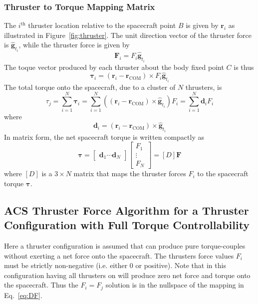 \subsubsection{Thruster to Torque Mapping Matrix}
The $i^{\text{th}}$ thruster location relative to the spacecraft point $B$ is given by $\bm r_{i}$ as illustrated in Figure~\ref{fig:thruster}.  The unit direction vector of the thruster force is $\hat{\bm g}_{t_{i}}$, while the thruster force is given by
\begin{equation}
	\label{eq:th:1}
	\bm F_{i} = F_{i} \hat{\bm g}_{t_{i}}
\end{equation}
The toque vector produced by each thruster about the body fixed point $C$ is thus
\begin{equation}
	\bm \tau_{i} = (\bm r_{i} - \bm r_{\text{COM}}) \times F_{i}  \hat{\bm g}_{t_{i}}
\end{equation}
The total torque onto the spacecraft, due to a cluster of $N$ thrusters, is
\begin{equation}
	\tau_{j} = \sum_{i=1}^{N} \bm \tau_{i} 
	= \sum_{i=1}^{N}  ((\bm r_{i} - \bm r_{\text{COM}}) \times \hat{\bm g}_{t_{i}}) F_{i} = \sum_{i=1}^{N}  \bm d_{i} F_{i}
\end{equation}
where 
\begin{equation}
	\label{eq:th1:1}
	\bm d_{i} =    ( \bm r_{i} - \bm r_{\text{COM}})  \times \hat{\bm g}_{t_{i}}
\end{equation}
In matrix form, the net spacecraft torque is written compactly as
\begin{equation}
	\label{eq:DF}
	 \bm\tau = \begin{bmatrix}
		 \bm d_{1} \cdots  \bm d_{N}
	\end{bmatrix} \begin{bmatrix}
		F_{1} \\
		\vdots \\
		F_{N}
	\end{bmatrix} = [D] \bm F
\end{equation}
where $[D]$ is a $3\times N$ matrix that maps the thruster forces $F_{i}$ to the spacecraft torque $\bm \tau$. 


\subsection{ACS Thruster Force Algorithm for a Thruster Configuration with Full Torque Controllability}
Here a thruster configuration is assumed that can produce pure torque-couples without exerting a net force onto the spacecraft.  The thrusters force values $F_{i}$ must be strictly non-negative (i.e. either 0 or positive).   Note that in this configuration having all thrusters on will produce zero net force and torque onto the spacecraft.  Thus the $F_{i} = F_{j}$ solution is in the nullspace of the mapping in Eq.~\eqref{eq:DF}.  

